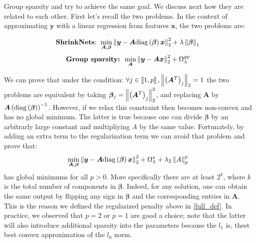 
Group sparsity and \shrink try to achieve the same goal. We discuss next how
they are related to each other. First let's recall the two problems. In the
context of approximating $\bm{y}$ with a linear regression from features
$\bm{x}$, the two problems are:%
\vspace{-0.25in}
\begin{multicols}{2}
    \begin{equation*}
        \text{{\bf ShrinkNets}: } \min_{\bm{A}, \bm{\beta}} \left\lVert\bm{y} - \bm{A}\text{diag}\left(\bm{\beta}\right)\bm{x}\right\rVert_2^2 + \lambda \left\lVert\bm{\beta}\right\rVert_1
    \end{equation*}
    \break
    \begin{equation*}
        \text{\textbf{Group sparsity: }}\min_{\bm{A}} \left\lVert\bm{y} - \bm{A}\bm{x}\right\rVert_2^2 + \Omega_\lambda^{gp}
    \end{equation*}
\end{multicols}
\vspace{-0.1in}

We can prove that under the condition: $\forall j\in \left\llbracket1, p\right\rrbracket,
\left\lVert\left(\bm{A}^T\right)_j\right\rVert_2 = 1$ the two problems are equivalent by taking
$\bm{\beta}_j = \left\lVert\left(\bm{A}^T\right)_j\right\rVert_2^2$, and replacing $\bm{A}$ by
$\bm{A}\left(\text{diag}\left(\bm{\beta}\right)\right)^{-1}$. However, if we relax this constraint
then \shrink becomes non-convex and has no global minimum. The latter is true
because one can divide $\bm{\beta}$ by an arbitrarly large constant and
multipliying $A$ by the same value. Fortunately, by adding an extra term to the \shrink
regularization term we can avoid that problem and prove that:
%
\begin{equation}
  \min_{\bm{A}, \bm{\beta}} \left\lVert\bm{y} - \bm{A}\text{diag}\left(\bm{\beta}\right)\bm{x}\right\rVert_2^2 + \Omega_\lambda^s + \lambda_2\left\lVert A\right\rVert_p^p
\end{equation}
%
has global minimums for all $p>0$. More specifically there are at least $2^k$,
where $k$ is the total number of components in $\bm{\beta}$. Indeed, for any
solution, one can obtain the same output by flipping any sign in $\bm{\beta}$
and the corresponding entries in $\bm{A}$.  This is the reason we defined the
regularized \shrink penalty above in \cref{full_def}.
In practice, we observed that $p=2$ or $p=1$ are good a choice; note that the latter
will also introduce additional sparsity into the parameters because the $l_1$ is, 
thest best convex approximation of the $l_0$ norm.